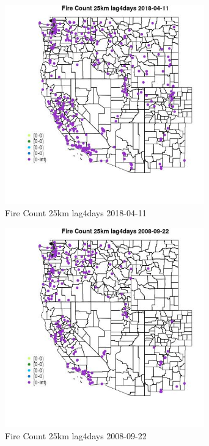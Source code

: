 \begin{figure} 
\centering  
\includegraphics[width=0.77\textwidth]{Code_Outputs/Report_ML_input_PM25_Step4_part_e_de_duplicated_aves_compiled_2019-05-18wNAs_MapObsFire_Count_25km_lag4days2018-04-11.jpg} 
\caption{\label{fig:Report_ML_input_PM25_Step4_part_e_de_duplicated_aves_compiled_2019-05-18wNAsMapObsFire_Count_25km_lag4days2018-04-11}Fire Count 25km lag4days 2018-04-11} 
\end{figure} 
 

\begin{figure} 
\centering  
\includegraphics[width=0.77\textwidth]{Code_Outputs/Report_ML_input_PM25_Step4_part_e_de_duplicated_aves_compiled_2019-05-18wNAs_MapObsFire_Count_25km_lag4days2008-09-22.jpg} 
\caption{\label{fig:Report_ML_input_PM25_Step4_part_e_de_duplicated_aves_compiled_2019-05-18wNAsMapObsFire_Count_25km_lag4days2008-09-22}Fire Count 25km lag4days 2008-09-22} 
\end{figure} 
 

